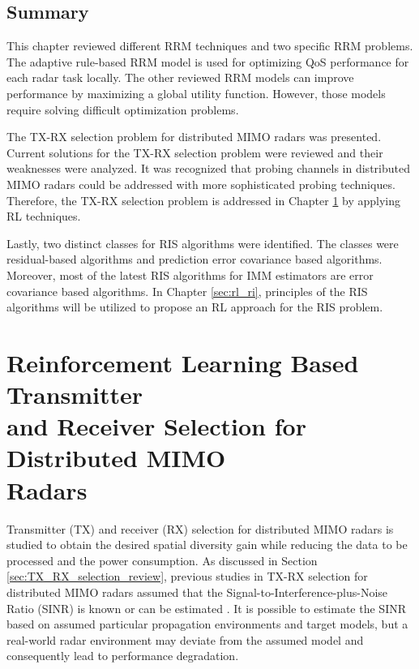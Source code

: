 \documentclass[english, 12pt, a4paper, elec, utf8, a-1b, online]{aaltothesis}
\numberwithin{equation}{section}
\begin{document}
\subsection{Summary}

This chapter reviewed different RRM techniques and two specific RRM problems.
The adaptive rule-based RRM model is used for optimizing QoS performance for each radar task locally.
The other reviewed RRM models can improve performance by maximizing a global utility function.
However, those models require solving difficult optimization problems.

The TX-RX selection problem for distributed MIMO radars was presented.
Current solutions for the TX-RX selection problem were reviewed and their weaknesses were analyzed.
It was recognized that probing channels in distributed MIMO radars could be addressed with more sophisticated probing techniques.
Therefore, the TX-RX selection problem is addressed in Chapter \ref{sec:RL_TX_RX} by applying RL techniques.

Lastly, two distinct classes for RIS algorithms were identified. 
The classes were residual-based algorithms and prediction error covariance based algorithms.
Moreover, most of the latest RIS algorithms for IMM estimators are error covariance based algorithms.
In Chapter \ref{sec:rl_ri}, principles of the RIS algorithms will be utilized to propose an RL approach for the RIS problem.


\newpage
\section[Reinforcement Learning Based Transmitter and Receiver Selection for Distributed MIMO Radars]{Reinforcement Learning Based Transmitter \\
and Receiver Selection for Distributed MIMO \\ Radars}\label{sec:RL_TX_RX}

Transmitter (TX) and receiver (RX) selection for distributed MIMO radars is studied to obtain the desired spatial diversity gain while reducing the data to be processed and the power consumption.
As discussed in Section \ref{sec:TX_RX_selection_review}, previous studies in TX-RX selection for distributed MIMO radars assumed that the Signal-to-Interference-plus-Noise Ratio (SINR) is known \cite{Sun2014} or can be estimated \cite{Godrich2011a, Godrich2011}.
It is possible to estimate the SINR based on assumed particular propagation environments and target models, but a real-world radar environment may deviate from the assumed model and consequently lead to performance degradation.
\end{document}
